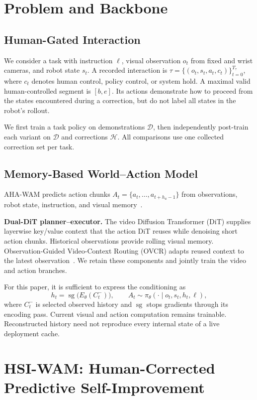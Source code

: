 \documentclass[letterpaper,10pt,conference]{ieeeconf}
\begin{document}
\section{Problem and Backbone}
\subsection{Human-Gated Interaction}
We consider a task with instruction $\ell$, visual observation $o_t$ from fixed and wrist cameras, and robot state $s_t$. A recorded interaction is $\tau=\{(o_t,s_t,a_t,c_t)\}_{t=0}^{T_\tau}$, where $c_t$ denotes human control, policy control, or system hold. A maximal valid human-controlled segment is $[b,e]$. Its actions demonstrate how to proceed from the states encountered during a correction, but do not label all states in the robot's rollout.

We first train a task policy on demonstrations $\mathcal D$, then independently post-train each variant on $\mathcal D$ and corrections $\mathcal H$. All comparisons use one collected correction set per task.

\subsection{Memory-Based World--Action Model}
AHA-WAM predicts action chunks $A_t=\{a_t,\ldots,a_{t+h_a-1}\}$ from observations, robot state, instruction, and visual memory~\cite{ahawam}.

\textbf{Dual-DiT planner--executor.} The video Diffusion Transformer (DiT) supplies layerwise key/value context that the action DiT reuses while denoising short action chunks. Historical observations provide rolling visual memory. Observation-Guided Video-Context Routing (OVCR) adapts reused context to the latest observation~\cite{ahawam}. We retain these components and jointly train the video and action branches.

For this paper, it is sufficient to express the conditioning as
\begin{equation}
 h_t=\operatorname{sg}\big(E_\theta(C_t^-)\big),\qquad
 A_t\sim\pi_\theta(\cdot\mid o_t,s_t,h_t,\ell),
 \label{eq:memory}
\end{equation}
where $C_t^-$ is selected observed history and $\operatorname{sg}$ stops gradients through its encoding pass. Current visual and action computation remains trainable. Reconstructed history need not reproduce every internal state of a live deployment cache.

\section{HSI-WAM: Human-Corrected Predictive Self-Improvement}
\end{document}
